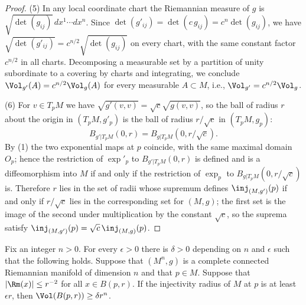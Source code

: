 \begin{proof}
(5) In any local coordinate chart the Riemannian measure of $g$ is
$\sqrt{\det(g_{ij})}\,dx^1\cdots dx^n$. Since
$\det(g'_{ij})=\det(c\,g_{ij})=c^n\det(g_{ij})$, we have
$\sqrt{\det(g'_{ij})}=c^{n/2}\sqrt{\det(g_{ij})}$ on every chart,
with the same constant factor $c^{n/2}$ in all charts. Decomposing
a measurable set by a partition of unity subordinate to a covering
by charts and integrating, we conclude
$\Vol_{g'}(A)=c^{n/2}\Vol_g(A)$ for every measurable $A\subset M$,
i.e., $\Vol_{g'}=c^{n/2}\Vol_g$.

(6) For $v\in T_pM$ we have $\sqrt{g'(v,v)}=\sqrt{c}\sqrt{g(v,v)}$,
so the ball of radius $r$ about the origin in $(T_pM,g'_p)$ is the
ball of radius $r/\sqrt{c}$ in $(T_pM,g_p)$:
$$B_{g'|T_pM}(0,r)=B_{g|T_pM}(0,r/\sqrt{c}).$$
By (1) the two exponential maps at $p$ coincide, with the same
maximal domain $O_p$; hence the restriction of $\exp'_p$ to
$B_{g'|T_pM}(0,r)$ is defined and is a diffeomorphism into $M$ if
and only if the restriction of $\exp_p$ to
$B_{g|T_pM}(0,r/\sqrt{c})$ is. Therefore $r$ lies in the set of
radii whose supremum defines $\inj_{(M,g')}(p)$ if and only if
$r/\sqrt{c}$ lies in the corresponding set for $(M,g)$; the first
set is the image of the second under multiplication by the
constant $\sqrt{c}$, so the suprema satisfy
$\inj_{(M,g')}(p)=\sqrt{c}\,\inj_{(M,g)}(p)$.
\end{proof}


\begin{proposition}
\label{prop:injectivity-radius-volume}
\label{injvol}
Fix an integer $n>0$. For every $\epsilon>0$ there is $\delta>0$
depending on $n$ and $\epsilon$ such that the following holds.
Suppose that $(M^n,g)$ is a complete connected Riemannian
manifold of dimension $n$ and that $p\in M$. Suppose that $|\Rm(x)|\le
r^{-2}$ for all $x\in B(p,r)$. If the injectivity radius of $M$ at
$p$ is at least $\epsilon r$, then $\Vol(B(p,r))\ge \delta
r^n$.
\end{proposition}

